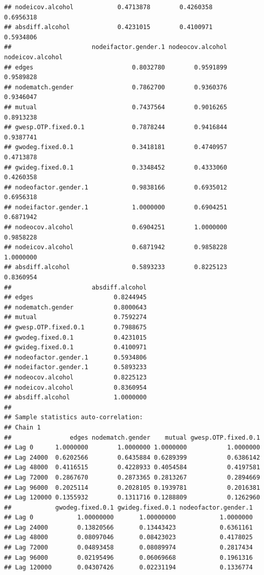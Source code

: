 \documentclass[
]{article}
\begin{document}
\begin{verbatim}
## nodeicov.alcohol            0.4713878        0.4260358            0.6956318
## absdiff.alcohol             0.4231015        0.4100971            0.5934806
##                      nodeifactor.gender.1 nodeocov.alcohol nodeicov.alcohol
## edges                           0.8032780        0.9591899        0.9589828
## nodematch.gender                0.7862700        0.9360376        0.9346047
## mutual                          0.7437564        0.9016265        0.8913238
## gwesp.OTP.fixed.0.1             0.7878244        0.9416844        0.9387741
## gwodeg.fixed.0.1                0.3418181        0.4740957        0.4713878
## gwideg.fixed.0.1                0.3348452        0.4333060        0.4260358
## nodeofactor.gender.1            0.9838166        0.6935012        0.6956318
## nodeifactor.gender.1            1.0000000        0.6904251        0.6871942
## nodeocov.alcohol                0.6904251        1.0000000        0.9858228
## nodeicov.alcohol                0.6871942        0.9858228        1.0000000
## absdiff.alcohol                 0.5893233        0.8225123        0.8360954
##                      absdiff.alcohol
## edges                      0.8244945
## nodematch.gender           0.8000643
## mutual                     0.7592274
## gwesp.OTP.fixed.0.1        0.7988675
## gwodeg.fixed.0.1           0.4231015
## gwideg.fixed.0.1           0.4100971
## nodeofactor.gender.1       0.5934806
## nodeifactor.gender.1       0.5893233
## nodeocov.alcohol           0.8225123
## nodeicov.alcohol           0.8360954
## absdiff.alcohol            1.0000000
## 
## Sample statistics auto-correlation:
## Chain 1 
##                edges nodematch.gender    mutual gwesp.OTP.fixed.0.1
## Lag 0      1.0000000        1.0000000 1.0000000           1.0000000
## Lag 24000  0.6202566        0.6435884 0.6289399           0.6386142
## Lag 48000  0.4116515        0.4228933 0.4054584           0.4197581
## Lag 72000  0.2867670        0.2873365 0.2813267           0.2894669
## Lag 96000  0.2025114        0.2028105 0.1939781           0.2016381
## Lag 120000 0.1355932        0.1311716 0.1288809           0.1262960
##            gwodeg.fixed.0.1 gwideg.fixed.0.1 nodeofactor.gender.1
## Lag 0            1.00000000       1.00000000            1.0000000
## Lag 24000        0.13820566       0.13443423            0.6361161
## Lag 48000        0.08097046       0.08423023            0.4178025
## Lag 72000        0.04893458       0.08089974            0.2817434
## Lag 96000        0.02195496       0.06069668            0.1961316
## Lag 120000       0.04307426       0.02231194            0.1336774

\end{verbatim}
\end{document}
